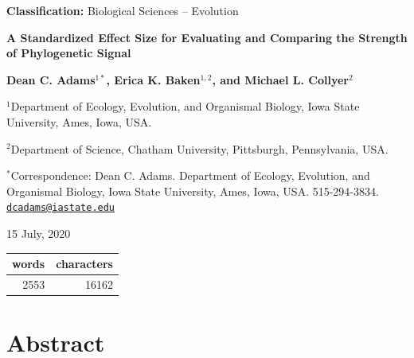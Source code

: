 \documentclass[
]{article}
\author{}
\date{\vspace{-2.5em}}
\begin{document}
\textbf{Classification:} Biological Sciences -- Evolution \hfill\break

\begin{center}
\textbf{A Standardized Effect Size for Evaluating and Comparing the Strength of Phylogenetic Signal}
\end{center}

\hfill\break

\begin{center}
\textbf{Dean C. Adams$^{1 *}$, Erica K. Baken$^{1,2}$,  and Michael L. Collyer$^{2}$}
\end{center}

\hfill\break

\(^{1}\)Department of Ecology, Evolution, and Organismal Biology, Iowa
State University, Ames, Iowa, USA.

\(^{2}\)Department of Science, Chatham University, Pittsburgh,
Pennsylvania, USA.

\(^{*}\)Correspondence: Dean C. Adams. Department of Ecology, Evolution,
and Organismal Biology, Iowa State University, Ames, Iowa, USA.
515-294-3834.
\href{mailto:dcadams@iastate.edu}{\nolinkurl{dcadams@iastate.edu}}

\hfill\break

\begin{center}15 July, 2020\end{center}

\hfill\break

\begin{longtable}[]{@{}rr@{}}
\toprule
words & characters\tabularnewline
\midrule
\endhead
2553 & 16162\tabularnewline
\bottomrule
\end{longtable}

\newpage

\hypertarget{abstract}{%
\section{Abstract}\label{abstract}}
\end{document}
